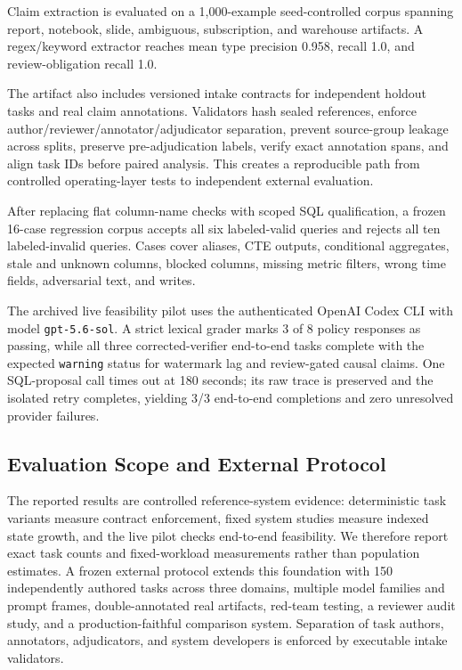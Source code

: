 \documentclass[10pt]{article}
\newcommand{\code}[1]{\texttt{#1}}
\begin{document}
Claim extraction is evaluated on a 1{,}000-example seed-controlled corpus spanning report, notebook, slide, ambiguous, subscription, and warehouse artifacts. A regex/keyword extractor reaches mean type precision 0.958, recall 1.0, and review-obligation recall 1.0.

The artifact also includes versioned intake contracts for independent holdout tasks and real claim annotations. Validators hash sealed references, enforce author/reviewer/annotator/adjudicator separation, prevent source-group leakage across splits, preserve pre-adjudication labels, verify exact annotation spans, and align task IDs before paired analysis. This creates a reproducible path from controlled operating-layer tests to independent external evaluation.

After replacing flat column-name checks with scoped SQL qualification, a frozen 16-case regression corpus accepts all six labeled-valid queries and rejects all ten labeled-invalid queries. Cases cover aliases, CTE outputs, conditional aggregates, stale and unknown columns, blocked columns, missing metric filters, wrong time fields, adversarial text, and writes.

The archived live feasibility pilot uses the authenticated OpenAI Codex CLI with model \code{gpt-5.6-sol}. A strict lexical grader marks 3 of 8 policy responses as passing, while all three corrected-verifier end-to-end tasks complete with the expected \code{warning} status for watermark lag and review-gated causal claims. One SQL-proposal call times out at 180 seconds; its raw trace is preserved and the isolated retry completes, yielding 3/3 end-to-end completions and zero unresolved provider failures.

\subsection{Evaluation Scope and External Protocol}
The reported results are controlled reference-system evidence: deterministic task variants measure contract enforcement, fixed system studies measure indexed state growth, and the live pilot checks end-to-end feasibility. We therefore report exact task counts and fixed-workload measurements rather than population estimates. A frozen external protocol extends this foundation with 150 independently authored tasks across three domains, multiple model families and prompt frames, double-annotated real artifacts, red-team testing, a reviewer audit study, and a production-faithful comparison system. Separation of task authors, annotators, adjudicators, and system developers is enforced by executable intake validators.
\end{document}
